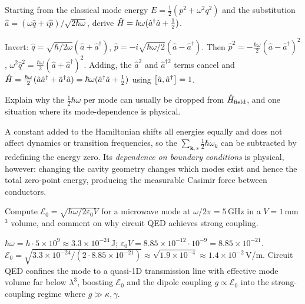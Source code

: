 \begin{exercise}
Starting from the classical mode energy
$E=\tfrac12(p^2+\omega^2 q^2)$ and the substitution
$\hat a=(\omega\hat q+i\hat p)/\sqrt{2\hbar\omega}$, derive
$\hat{H}=\hbar\omega(\hat a^\dagger\hat a+\tfrac12)$.
\begin{solution}
Invert: $\hat q=\sqrt{\hbar/2\omega}(\hat a+\hat a^\dagger)$,
$\hat p=-i\sqrt{\hbar\omega/2}(\hat a-\hat a^\dagger)$. Then
$\hat p^2=-\tfrac{\hbar\omega}2(\hat a-\hat a^\dagger)^2$,
$\omega^2\hat q^2=\tfrac{\hbar\omega}2(\hat a+\hat a^\dagger)^2$.
Adding, the $\hat a^2$ and $\hat a^{\dagger2}$ terms cancel and
$\hat{H}=\tfrac{\hbar\omega}2(\hat a\hat a^\dagger+\hat a^\dagger\hat a)
=\hbar\omega(\hat a^\dagger\hat a+\tfrac12)$ using
$\comm{\hat a}{\hat a^\dagger}=1$.
\end{solution}
\end{exercise}

\begin{exercise}
Explain why the $\tfrac12\hbar\omega$ per mode can usually be dropped
from $\hat{H}_{\rm field}$, and one situation where its
mode-dependence is physical.
\begin{solution}
A constant added to the Hamiltonian shifts all energies equally and
does not affect dynamics or transition frequencies, so the
$\sum_{\bm k,s}\tfrac12\hbar\omega_k$ can be subtracted by redefining
the energy zero. Its \emph{dependence on boundary conditions} is
physical, however: changing the cavity geometry changes which modes
exist and hence the total zero-point energy, producing the
measurable Casimir force between conductors.
\end{solution}
\end{exercise}

\begin{exercise}
Compute $\mathcal E_0=\sqrt{\hbar\omega/2\varepsilon_0 V}$ for a
microwave mode at $\omega/2\pi=5\,$GHz in a $V=1\,$mm$^3$ volume,
and comment on why circuit QED achieves strong coupling.
\begin{solution}
$\hbar\omega=h\cdot5\times10^9\approx3.3\times10^{-24}\,$J;
$\varepsilon_0 V=8.85\times10^{-12}\cdot10^{-9}=8.85\times10^{-21}$.
$\mathcal E_0=\sqrt{3.3\times10^{-24}/(2\cdot8.85\times10^{-21})}
\approx\sqrt{1.9\times10^{-4}}\approx1.4\times10^{-2}\,$V/m.
Circuit QED confines the mode to a quasi-1D transmission line with
effective mode volume far below $\lambda^3$, boosting $\mathcal E_0$
and the dipole coupling $g\propto\mathcal E_0$ into the strong-coupling
regime where $g\gg\kappa,\gamma$.
\end{solution}
\end{exercise}


